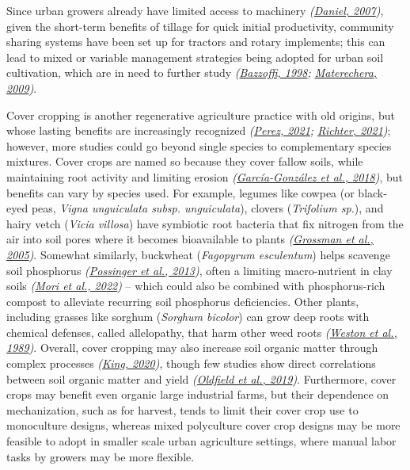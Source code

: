 \documentclass[
  12pt,
]{article}
\begin{document}
Since urban growers already have limited access to machinery \emph{(\protect\hyperlink{ref-daniel07}{Daniel, 2007})}, given the short-term benefits of tillage for quick initial productivity, community sharing systems have been set up for tractors and rotary implements; this can lead to mixed or variable management strategies being adopted for urban soil cultivation, which are in need to further study \emph{(\protect\hyperlink{ref-bazzoffi98}{Bazzoffi, 1998}; \protect\hyperlink{ref-materechera09}{Materechera, 2009})}.

Cover cropping is another regenerative agriculture practice with old origins, but whose lasting benefits are increasingly recognized \emph{(\protect\hyperlink{ref-perez21}{Perez, 2021}; \protect\hyperlink{ref-richter21}{Richter, 2021})}; however, more studies could go beyond single species to complementary species mixtures.
Cover crops are named so because they cover fallow soils, while maintaining root activity and limiting erosion \emph{(\protect\hyperlink{ref-garcia-gonzalez18}{García-González et al., 2018})}, but benefits can vary by species used.
For example, legumes like cowpea (or black-eyed peas, \emph{Vigna unguiculata subsp. unguiculata}), clovers (\emph{Trifolium sp.}), and hairy vetch (\emph{Vicia villosa}) have symbiotic root bacteria that fix nitrogen from the air into soil pores where it becomes bioavailable to plants \emph{(\protect\hyperlink{ref-grossman05}{Grossman et al., 2005})}.
Somewhat similarly, buckwheat (\emph{Fagopyrum esculentum}) helps scavenge soil phosphorus \emph{(\protect\hyperlink{ref-possinger13}{Possinger et al., 2013})}, often a limiting macro-nutrient in clay soils \emph{(\protect\hyperlink{ref-mori22}{Mori et al., 2022})} -- which could also be combined with phosphorus-rich compost to alleviate recurring soil phosphorus deficiencies.
Other plants, including grasses like sorghum (\emph{Sorghum bicolor}) can grow deep roots with chemical defenses, called allelopathy, that harm other weed roots \emph{(\protect\hyperlink{ref-weston89}{Weston et al., 1989})}.
Overall, cover cropping may also increase soil organic matter through complex processes \emph{(\protect\hyperlink{ref-king20}{King, 2020})}, though few studies show direct correlations between soil organic matter and yield \emph{(\protect\hyperlink{ref-oldfield19}{Oldfield et al., 2019})}.
Furthermore, cover crops may benefit even organic large industrial farms, but their dependence on mechanization, such as for harvest, tends to limit their cover crop use to monoculture designs, whereas mixed polyculture cover crop designs may be more feasible to adopt in smaller scale urban agriculture settings, where manual labor tasks by growers may be more flexible.
\end{document}
